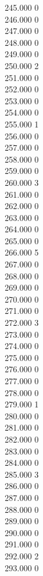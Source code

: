 { 245.000	0 \\
 246.000	0 \\
 247.000	0 \\
 248.000	0 \\
 249.000	0 \\
 250.000	2 \\
 251.000	0 \\
 252.000	0 \\
 253.000	0 \\
 254.000	0 \\
 255.000	1 \\
 256.000	0 \\
 257.000	0 \\
 258.000	0 \\
 259.000	0 \\
 260.000	3 \\
 261.000	0 \\
 262.000	0 \\
 263.000	0 \\
 264.000	0 \\
 265.000	0 \\
 266.000	5 \\
 267.000	0 \\
 268.000	0 \\
 269.000	0 \\
 270.000	0 \\
 271.000	0 \\
 272.000	3 \\
 273.000	0 \\
 274.000	0 \\
 275.000	0 \\
 276.000	0 \\
 277.000	0 \\
 278.000	0 \\
 279.000	1 \\
 280.000	0 \\
 281.000	0 \\
 282.000	0 \\
 283.000	0 \\
 284.000	0 \\
 285.000	3 \\
 286.000	0 \\
 287.000	0 \\
 288.000	0 \\
 289.000	0 \\
 290.000	0 \\
 291.000	0 \\
 292.000	2 \\
 293.000	0 \\
}
